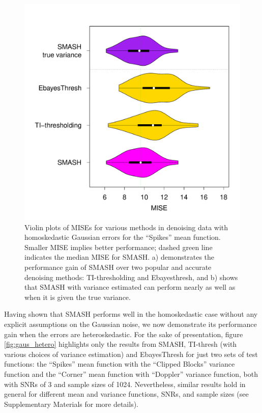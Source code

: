 \documentclass[12pt]{article}
\begin{document}
\begin{figure}
\centering
    \includegraphics[width=\textwidth]{violin_gaus_homo.pdf}
    \caption{Violin plots of MISEs for various methods in denoising data with homoskedastic Gaussian errors for the ``Spikes'' mean function. Smaller MISE implies better performance; dashed green line indicates the median MISE for SMASH. a) demonstrates the performance gain of SMASH over two popular and accurate denoising methods: TI-thresholding and Ebayesthresh, and b) shows that SMASH with variance estimated can perform nearly as well as when it is given the true variance.}
    \label{fig:gaus_homo}
\end{figure}

Having shown that SMASH performs well in the homoskedastic case without any explicit assumptions on the Gaussian noise, we now demonstrate its performance gain when the errors are heteroskedastic. For the sake of presentation, figure \ref{fig:gaus_hetero} highlights only the results from SMASH, TI-thresh (with various choices of variance estimation) and EbayesThresh for just two sets of test functions: the ``Spikes'' mean function with the ``Clipped Blocks'' variance function and the ``Corner'' mean function with ``Doppler'' variance function, both with SNRs of 3 and sample sizes of 1024. Nevertheless, similar results hold in general for different mean and variance functions, SNRs, and sample sizes (see Supplementary Materials for more details). 
\end{document}
